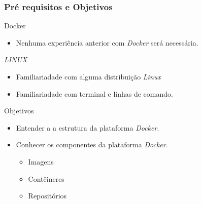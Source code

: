 \documentclass[12pt]{beamer}
\begin{document}
\begin{frame}
  \frametitle{Pré requisitos e Objetivos}
  \begin{block}{Docker}
  \begin{itemize}
		\item Nenhuma experiência anterior com \emph{Docker} será necessária.
  \end{itemize}
  \end{block}

	\begin{block}{\emph{LINUX}}
  \begin{itemize}
		\item Familiariadade com alguma distribuição \emph{Linux}
		\item Familiariadade com terminal e linhas de comando.
  \end{itemize}
  \end{block}

  \begin{block}{Objetivos}
  \begin{itemize}
		\item Entender a a estrutura da plataforma \emph{Docker}.
		\item Conhecer os componentes da plataforma \emph{Docker}.
						\begin{itemize}
										\item Imagens
										\item Contêineres
										\item Repositórios
						\end{itemize}
  \end{itemize}
  \end{block}
\end{frame}
\end{document}
